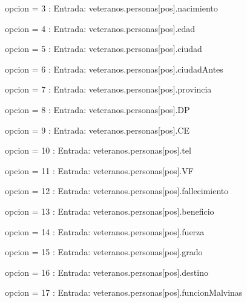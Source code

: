 \documentclass{article}
\begin{document}
                    \hspace{20mm}opcion = 3 : Entrada: veteranos.personas[pos].nacimiento
                    
                    \hspace{20mm}opcion = 4 : Entrada: veteranos.personas[pos].edad
                    
                    \hspace{20mm}opcion = 5 : Entrada: veteranos.personas[pos].ciudad
                    
                    \hspace{20mm}opcion = 6 : Entrada: veteranos.personas[pos].ciudadAntes

                    \hspace{20mm}opcion = 7 : Entrada: veteranos.personas[pos].provincia

                    \hspace{20mm}opcion = 8 : Entrada: veteranos.personas[pos].DP
                    
                    \hspace{20mm}opcion = 9 : Entrada: veteranos.personas[pos].CE
                    
                    \hspace{20mm}opcion = 10 : Entrada: veteranos.personas[pos].tel
                    
                    \hspace{20mm}opcion = 11 : Entrada: veteranos.personas[pos].VF
                    
                    \hspace{20mm}opcion = 12 : Entrada: veteranos.personas[pos].fallecimiento

                    \hspace{20mm}opcion = 13 : Entrada: veteranos.personas[pos].beneficio

                    \hspace{20mm}opcion = 14 : Entrada: veteranos.personas[pos].fuerza

                    \hspace{20mm}opcion = 15 : Entrada: veteranos.personas[pos].grado

                    \hspace{20mm}opcion = 16 : Entrada: veteranos.personas[pos].destino

                    \hspace{20mm}opcion = 17 : Entrada: veteranos.personas[pos].funcionMalvinas
\end{document}
